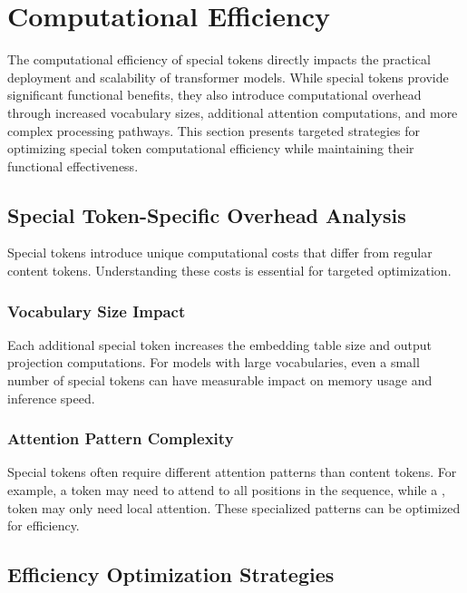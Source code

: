 
\section{Computational Efficiency}

The computational efficiency of special tokens directly impacts the practical deployment and scalability of transformer models. While special tokens provide significant functional benefits, they also introduce computational overhead through increased vocabulary sizes, additional attention computations, and more complex processing pathways. This section presents targeted strategies for optimizing special token computational efficiency while maintaining their functional effectiveness.

\subsection{Special Token-Specific Overhead Analysis}

Special tokens introduce unique computational costs that differ from regular content tokens. Understanding these costs is essential for targeted optimization.

\subsubsection{Vocabulary Size Impact}

Each additional special token increases the embedding table size and output projection computations. For models with large vocabularies, even a small number of special tokens can have measurable impact on memory usage and inference speed.

\subsubsection{Attention Pattern Complexity}

Special tokens often require different attention patterns than content tokens. For example, a \cls{} token may need to attend to all positions in the sequence, while a \sep{} token may only need local attention. These specialized patterns can be optimized for efficiency.

\subsection{Efficiency Optimization Strategies}

